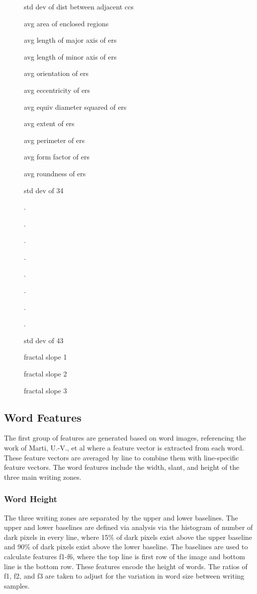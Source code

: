 \documentclass[paper=a4, fontsize=11pt]{scrartcl} %
\numberwithin{equation}{section} %
\numberwithin{figure}{section} %
\numberwithin{table}{section} %
\begin{document}
\begin{figure}
\begin{multicols}{3}
\begin{enumerate*}
\item std dev of dist between adjacent ccs		
\item avg area of enclosed regions			
\item avg length of major axis of ers			
\item avg length of minor axis of ers			
\item avg orientation of ers					
\item avg eccentricity of ers				
\item avg equiv diameter squared of ers			
\item avg extent of ers					
\item avg perimeter of ers					
\item avg form factor of ers				
\item avg roundness of ers					
\item std dev of 34						
\item .							
\item .							
\item .							
\item .							
\item .							
\item .							
\item .							
\item .							
\item std dev of 43						
\item fractal slope 1						
\item fractal slope 2						
\item fractal slope 3	
\end{enumerate*}
\end{multicols}
\end{figure}

\subsection{Word Features}
The first group of features are generated based on word images,
referencing the work of Marti, U.-V., et al \cite{WriterID} where a
feature vector is extracted from each word. These feature vectors are
averaged by line to combine them with line-specific feature
vectors. The word features include the width, slant, and height of the
three main writing zones.

\subsubsection{Word Height}
The three writing zones are separated by the upper and lower
baselines. The upper and lower baselines are defined via analysis via
the histogram of number of dark pixels in every line, where 15\% of
dark pixels exist above the upper baseline and 90\% of dark pixels
exist above the lower baseline. The baselines are used to calculate
features f1-f6, where the top line is first row of the image and
bottom line is the bottom row. These features encode the height of
words. The ratios of f1, f2, and f3 are taken to adjust for the
variation in word size between writing samples.
\end{document}
